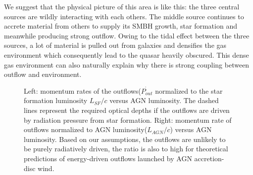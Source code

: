 \documentclass{subfiles}
\begin{document}
We suggest that the physical picture of this area is like this: the three central sources are wildly interacting with each others. The middle source continues to accrete material from others to supply its SMBH growth, star formation and meanwhile producing strong outflow. Owing to the tidal effect between the three sources, a lot of material is pulled out from galaxies and densifies the gas environment which consequently lead to the quasar heavily obscured. This dense gas environment can also naturally explain why there is strong coupling between outflow and environment.
	\begin{figure}
		\centering
		\label{coupeffic}
		\caption{Left: momentum rates of the outflows($\dot{P_{out}}$ normalized to the star formation luminosity $L_{SF}/c$ versus AGN luminosity. The dashed lines represent the required optical depths if the outflows are driven by radiation pressure from star formation. Right: momentum rate of outflows normalized to AGN luminosity($L_{AGN}/c$) versus AGN luminosity. Based on our assumptions, the outflows are unlikely to be purely radiatively driven, the ratio is also to high for theoretical predictions of energy-driven outflows launched by AGN accretion-disc wind.}
	\end{figure}
\end{document}
